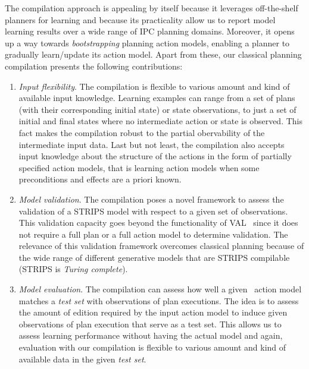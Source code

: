 The compilation approach is appealing by itself because it leverages off-the-shelf planners for learning and because its practicality allow us to report model learning results over a wide range of IPC planning domains. Moreover, it opens up a way towards \emph{bootstrapping} planning action models, enabling a planner to gradually learn/update its action model. Apart from these, our classical planning compilation presents the following contributions:
\begin{enumerate}
\item {\em Input flexibility}. The compilation is flexible to various amount and kind of available input knowledge. Learning examples can range from a set of plans (with their corresponding initial state) or state observations, to just a set of initial and final states where no intermediate action or state is observed. This fact makes the compilation robust to the partial obervability of the intermediate input data. Last but not least, the compilation also accepts input knowledge about the structure of the actions in the form of partially specified action models, that is learning action models when some preconditions and effects are a priori known. %

\item {\em Model validation}. The compilation poses a novel framework to assess the validation of a STRIPS model with respect to a given set of observations. This validation capacity goes beyond the functionality of VAL~\cite{howey2004val} since it does not require a full plan or a full action model to determine validation. The relevance of this validation framework overcomes classical planning because of the wide range of different generative models that are STRIPS compilable (STRIPS is {\em Turing complete}). 
  
\item {\em Model evaluation}. The compilation can assess how well a given \strips\ action model matches a {\em test set} with observations of plan executions. The idea is to assess the amount of edition required by the input action model to induce given observations of plan execution that serve as a test set. This allows us to assess learning performance without having the actual model and again, evaluation with our compilation is flexible to various amount and kind of available data in the given {\em test set}. 
\end{enumerate}

